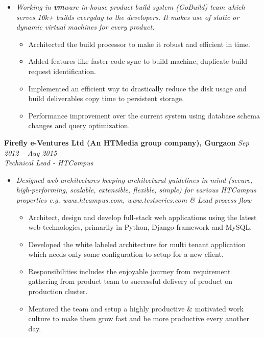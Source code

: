 \documentclass[margin,line]{resume}
\begin{document}
\begin{resume}
\begin{itemize}
     \item \textsl{Working in \textbf{vm}ware in-house product build system (GoBuild) team which serves 10k+ builds everyday to the developers. It makes use of static or dynamic virtual machines for every product.}
        \begin{itemize}
            \item Architected the build processor to make it robust and efficient in time.
            \item Added features like faster code sync to build machine, duplicate build request identification.
            \item Implemented an efficient way to drastically reduce the disk usage and build deliverables copy time to persistent storage.
            \item Performance improvement over the current system using database schema changes and query optimization.
        \end{itemize}
   \end{itemize}

\newpage

    \textbf{Firefly e-Ventures Ltd (An HTMedia group company), Gurgaon} \hfill \textsl{Sep 2012 -- Aug 2015} \vspace{0mm}\\\vspace{0mm}%
           \textsl{Technical Lead - HTCampus}\\
    \begin{itemize}
    
     \item \textsl{Designed web architectures keeping architectural guidelines in mind (secure, high-performing, scalable, extensible, flexible, simple) for various HTCampus properties e.g. www.htcampus.com, www.testseries.com \& Lead process flow}
        \begin{itemize}
            \item Architect, design and develop full-stack web applications using the latest web technologies, primarily in Python, Django framework and MySQL.
            \item Developed the white labeled architecture for multi tenant application which needs only some configuration to setup for a new client.
            \item Responsibilities includes the enjoyable journey from requirement gathering from product team to successful delivery of product on production cluster.
            \item Mentored the team and setup a highly productive \& motivated work culture to make them grow fast and be more productive every another day.
        \end{itemize}
   \end{itemize}


\end{resume}
\end{document}
